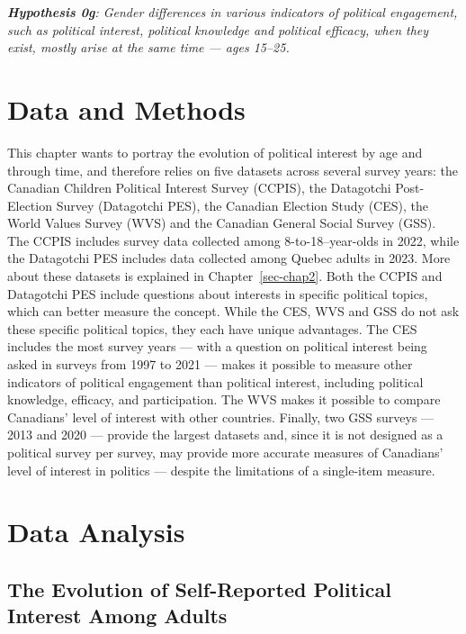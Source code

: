 \documentclass[
  letterpaper,
  DIV=11,
  numbers=noendperiod]{scrreprt}
\begin{document}
\emph{\textbf{Hypothesis 0g}: Gender differences in various indicators
of political engagement, such as political interest, political knowledge
and political efficacy, when they exist, mostly arise at the same time
--- ages 15--25.}

\hypertarget{data-and-methods}{%
\section{Data and Methods}\label{data-and-methods}}

This chapter wants to portray the evolution of political interest by age
and through time, and therefore relies on five datasets across several
survey years: the Canadian Children Political Interest Survey (CCPIS),
the Datagotchi Post-Election Survey (Datagotchi PES), the Canadian
Election Study (CES), the World Values Survey (WVS) and the Canadian
General Social Survey (GSS). The CCPIS includes survey data collected
among 8-to-18--year-olds in 2022, while the Datagotchi PES includes data
collected among Quebec adults in 2023. More about these datasets is
explained in Chapter~\ref{sec-chap2}. Both the CCPIS and Datagotchi PES
include questions about interests in specific political topics, which
can better measure the concept. While the CES, WVS and GSS do not ask
these specific political topics, they each have unique advantages. The
CES includes the most survey years --- with a question on political
interest being asked in surveys from 1997 to 2021 --- makes it possible
to measure other indicators of political engagement than political
interest, including political knowledge, efficacy, and participation.
The WVS makes it possible to compare Canadians' level of interest with
other countries. Finally, two GSS surveys --- 2013 and 2020 --- provide
the largest datasets and, since it is not designed as a political survey
per survey, may provide more accurate measures of Canadians' level of
interest in politics --- despite the limitations of a single-item
measure.

\hypertarget{data-analysis}{%
\section{Data Analysis}\label{data-analysis}}

\hypertarget{the-evolution-of-self-reported-political-interest-among-adults}{%
\subsection{The Evolution of Self-Reported Political Interest Among
Adults}\label{the-evolution-of-self-reported-political-interest-among-adults}}
\end{document}
